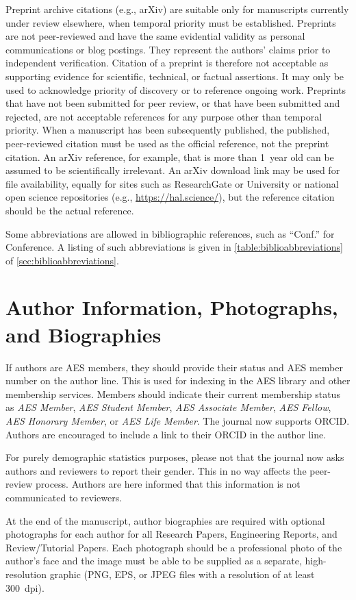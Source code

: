 \documentclass[fleqn,draft]{jaes}
\begin{document}
Preprint archive citations (e.g., arXiv) are suitable only for manuscripts currently under review elsewhere, when temporal priority must be established. Preprints are not peer-reviewed and have the same evidential validity as personal communications or blog postings. They represent the authors’ claims prior to independent verification. Citation of a preprint is therefore not acceptable as supporting evidence for scientific, technical, or factual assertions. It may only be used to acknowledge priority of discovery or to reference ongoing work. Preprints that have not been submitted for peer review, or that have been submitted and rejected, are not acceptable references for any purpose other than temporal priority. When a manuscript has been subsequently published, the published, peer-reviewed citation must be used as the official reference, not the preprint citation. An arXiv reference, for example, that is more than 1~year old can be assumed to be scientifically irrelevant. An arXiv download link may be used for file availability, equally for sites such as ResearchGate or University or national open science repositories (e.g., \url{https://hal.science/}), but the reference citation should be the actual reference. 

Some abbreviations are allowed in bibliographic references, such as ``Conf.'' for Conference. A listing of such abbreviations is given in \cref{table:biblioabbreviations} of \cref{sec:biblioabbreviations}.

\section{Author Information, Photographs, and Biographies}\label{sec:authophoto}
If authors are AES members, they should provide their status and AES member number on the author line. This is used for indexing in the AES library and other membership services. Members should indicate their current membership status as \emph{AES Member}, \emph{AES Student Member}, \emph{AES Associate Member}, \emph{AES Fellow}, \emph{AES Honorary Member}, or \emph{AES Life Member}.
The journal now supports ORCID. Authors are encouraged to include a link to their ORCID in the author line. 

For purely demographic statistics purposes, please not that the journal now asks authors and reviewers to report their gender. This in no way affects the peer-review process. Authors are here informed that this information is not communicated to reviewers. 

At the end of the manuscript, author biographies are required with optional photographs for each author for all Research Papers, Engineering Reports, and Review/Tutorial Papers. Each photograph should be a professional photo of the author’s face and the image must be able to be supplied as a separate, high-resolution graphic (PNG, EPS, or JPEG files with a resolution of at least 300~dpi). 
\end{document}
